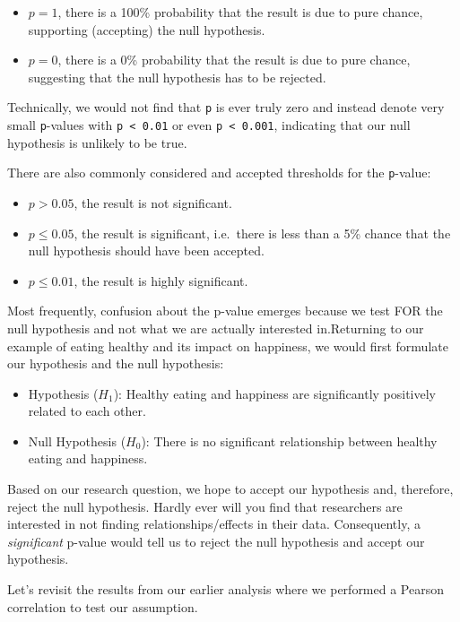 \documentclass[
  letterpaper,
]{krantz}
\begin{document}
\begin{itemize}
\item
  \(p = 1\), there is a 100\% probability that the result is due to pure
  chance, supporting (accepting) the null hypothesis.
\item
  \(p = 0\), there is a 0\% probability that the result is due to pure
  chance, suggesting that the null hypothesis has to be rejected.
\end{itemize}

Technically, we would not find that \texttt{p} is ever truly zero and
instead denote very small \texttt{p}-values with
\texttt{p\ \textless{}\ 0.01} or even \texttt{p\ \textless{}\ 0.001},
indicating that our null hypothesis is unlikely to be true.

There are also commonly considered and accepted thresholds for the
\texttt{p}-value:

\begin{itemize}
\item
  \(p > 0.05\), the result is not significant.
\item
  \(p \leq 0.05\), the result is significant, i.e.~there is less than a
  5\% chance that the null hypothesis should have been accepted.
\item
  \(p \leq 0.01\), the result is highly significant.
\end{itemize}

Most frequently, confusion about the p-value emerges because we test FOR
the null hypothesis and not what we are actually interested in.Returning
to our example of eating healthy and its impact on happiness, we would
first formulate our hypothesis and the null hypothesis:

\begin{itemize}
\item
  Hypothesis (\(H_1\)): Healthy eating and happiness are significantly
  positively related to each other.
\item
  Null Hypothesis (\(H_0\)): There is no significant relationship
  between healthy eating and happiness.
\end{itemize}

Based on our research question, we hope to accept our hypothesis and,
therefore, reject the null hypothesis. Hardly ever will you find that
researchers are interested in not finding relationships/effects in their
data. Consequently, a \emph{significant} p-value would tell us to reject
the null hypothesis and accept our hypothesis.

Let's revisit the results from our earlier analysis where we performed a
Pearson correlation to test our assumption.
\end{document}
